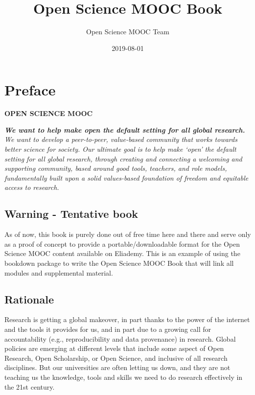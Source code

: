 \documentclass[]{book}
\title{Open Science MOOC Book}
\author{Open Science MOOC Team}
\date{2019-08-01}
\begin{document}
\maketitle

{
\setcounter{tocdepth}{1}
\tableofcontents
}
\hypertarget{preface}{%
\chapter*{Preface}\label{preface}}

\textbf{OPEN SCIENCE MOOC}

\textbf{\emph{We want to help make open the default setting for all global research.}} \emph{We want to develop a peer-to-peer, value-based community that works towards better science for society. Our ultimate goal is to help make `open' the default setting for all global research, through creating and connecting a welcoming and supporting community, based around good tools, teachers, and role models, fundamentally built upon a solid values-based foundation of freedom and equitable access to research.}

\hypertarget{warning---tentative-book}{%
\section*{Warning - Tentative book}\label{warning---tentative-book}}

As of now, this book is purely done out of free time here and there and serve only as a proof of concept to provide a portable/downloadable format for the Open Science MOOC content available on Eliademy. This is an example of using the bookdown package to write the Open Science MOOC Book that will link all modules and supplemental material.

\hypertarget{rationale}{%
\section*{Rationale}\label{rationale}}

Research is getting a global makeover, in part thanks to the power of the internet and the tools it provides for us, and in part due to a growing call for accountability (e.g., reproducibility and data provenance) in research. Global policies are emerging at different levels that include some aspect of Open Research, Open Scholarship, or Open Science, and inclusive of all research disciplines. But our universities are often letting us down, and they are not teaching us the knowledge, tools and skills we need to do research effectively in the 21st century.
\end{document}

